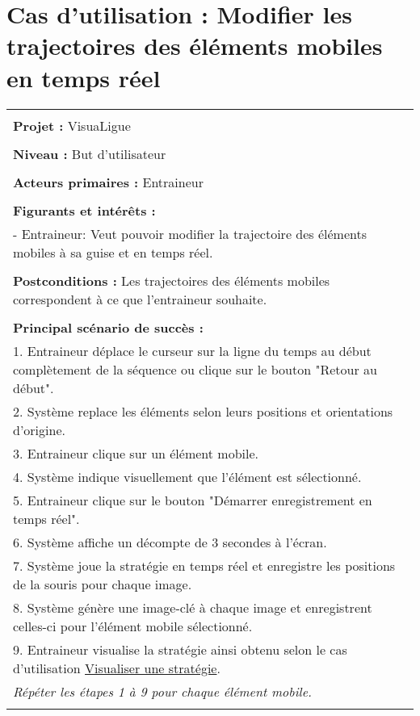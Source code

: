 \section{Cas d'utilisation : Modifier les trajectoires des éléments mobiles en temps réel}
\begin{longtable}{|p{16cm}|}
	\hline
	\\
	\textbf{Projet :} VisuaLigue\\
	\\
	\textbf{Niveau :} But d'utilisateur\\
	\\
	\textbf{Acteurs primaires :} Entraineur\\
	\\
	\textbf{Figurants et intérêts :} \\
	- Entraineur: Veut pouvoir modifier la trajectoire des éléments mobiles à sa guise et en temps réel.\\
	\\
	\textbf{Postconditions :} Les trajectoires des éléments mobiles correspondent à ce que l'entraineur souhaite.\\
	\\
	\textbf{Principal scénario de succès :}\\
	1. Entraineur déplace le curseur sur la ligne du temps au début complètement de la séquence ou clique sur le bouton "Retour au début".\\
	2. Système replace les éléments selon leurs positions et orientations d'origine.\\
	3. Entraineur clique sur un élément mobile.\\
	4. Système indique visuellement que l'élément est sélectionné.\\
	5. Entraineur clique sur le bouton "Démarrer enregistrement en temps réel".\\
	6. Système affiche un décompte de 3 secondes à l'écran.\\
	7. Système joue la stratégie en temps réel et enregistre les positions de la souris pour chaque image.\\
	8. Système génère une image-clé à chaque image et enregistrent celles-ci pour l'élément mobile sélectionné.\\
	9. Entraineur visualise la stratégie ainsi obtenu selon le cas d'utilisation \underline{Visualiser une stratégie}.\\
	\textit{Répéter les étapes 1 à 9 pour chaque élément mobile.}\\
	\\

\end{longtable}
